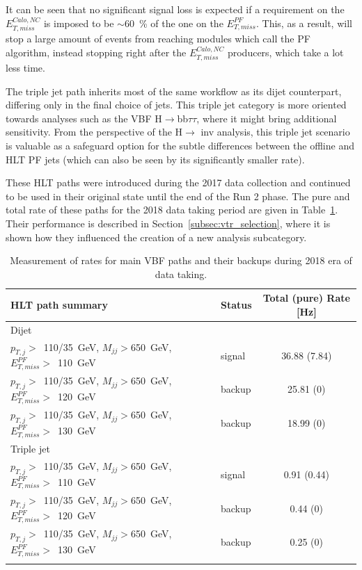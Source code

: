 It can be seen that no significant signal loss is expected if a requirement on the $E^{Calo, NC}_{T,miss}$ is imposed to be $\sim$60~\% of the one on the $E^{PF}_{T,miss}$. This, as a result, will stop a large amount of events from reaching modules which call the PF algorithm, instead stopping right after the $E^{Calo, NC}_{T,miss}$ producers, which take a lot less time.

\hspace{10pt} The triple jet path inherits most of the same workflow as its dijet counterpart, differing only in the final choice of jets. This triple jet category is more oriented towards analyses such as the VBF H$\rightarrow$bb$\tau\tau$, where it might bring additional sensitivity. From the perspective of the H$\rightarrow$ inv analysis, this triple jet scenario is valuable as a safeguard option for the subtle differences between the offline and HLT PF jets (which can also be seen by its significantly smaller rate).

\hspace{10pt} These HLT paths were introduced during the 2017 data collection and continued to be used in their original state until the end of the Run 2 phase. The pure and total rate of these paths for the 2018 data taking period are given in Table~\ref{tab:hlt_rates}. Their performance is described in Section~\ref{subsec:vtr_selection}, where it is shown how they influenced the creation of a new analysis subcategory.

\begin{table}[htbp]
    \centering
    \footnotesize
    \begin{tabular}{llc}
     HLT path summary & Status &Total (pure) Rate [Hz] \\   \hline\hline
          Dijet & & \\
      $p_{T,j}>$~110/35~GeV, $M_{jj}>$650~GeV, $E^{PF}_{T,miss}>$~110~GeV &  signal & 36.88 (7.84)\\
      $p_{T,j}>$~110/35~GeV, $M_{jj}>$650~GeV, $E^{PF}_{T,miss}>$~120~GeV &  backup & 25.81 (0) \\
      $p_{T,j}>$~110/35~GeV, $M_{jj}>$650~GeV, $E^{PF}_{T,miss}>$~130~GeV   &  backup & 18.99 (0)\\
      Triple jet& & \\
       $p_{T,j}>$~110/35~GeV, $M_{jj}>$650~GeV, $E^{PF}_{T,miss}>$~110~GeV & signal & 0.91 (0.44) \\
       $p_{T,j}>$~110/35~GeV, $M_{jj}>$650~GeV, $E^{PF}_{T,miss}>$~120~GeV & backup & 0.44 (0)\\
       $p_{T,j}>$~110/35~GeV, $M_{jj}>$650~GeV, $E^{PF}_{T,miss}>$~130~GeV& backup & 0.25 (0)\\
      & &  \\\hline\hline
    \end{tabular}
    \caption{Measurement of rates for main VBF paths and their backups during 2018 era of data taking.}
    \label{tab:hlt_rates}
\end{table}

